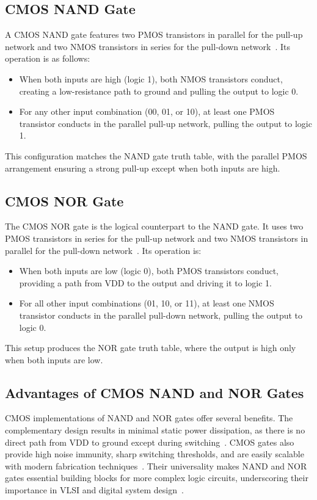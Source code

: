 \documentclass[12pt]{article}
\begin{document}
\subsection*{CMOS NAND Gate}
A CMOS NAND gate features two PMOS transistors in parallel for the pull-up network and two NMOS transistors in series for the pull-down network~\cite{weste2015cmos}. Its operation is as follows:
\begin{itemize}
    \item When both inputs are high (logic 1), both NMOS transistors conduct, creating a low-resistance path to ground and pulling the output to logic 0.
    \item For any other input combination (00, 01, or 10), at least one PMOS transistor conducts in the parallel pull-up network, pulling the output to logic 1.
\end{itemize}
This configuration matches the NAND gate truth table, with the parallel PMOS arrangement ensuring a strong pull-up except when both inputs are high.

\subsection*{CMOS NOR Gate}
The CMOS NOR gate is the logical counterpart to the NAND gate. It uses two PMOS transistors in series for the pull-up network and two NMOS transistors in parallel for the pull-down network~\cite{kang2019cmos}. Its operation is:
\begin{itemize}
    \item When both inputs are low (logic 0), both PMOS transistors conduct, providing a path from VDD to the output and driving it to logic 1.
    \item For all other input combinations (01, 10, or 11), at least one NMOS transistor conducts in the parallel pull-down network, pulling the output to logic 0.
\end{itemize}
This setup produces the NOR gate truth table, where the output is high only when both inputs are low.

\subsection*{Advantages of CMOS NAND and NOR Gates}
CMOS implementations of NAND and NOR gates offer several benefits. The complementary design results in minimal static power dissipation, as there is no direct path from VDD to ground except during switching~\cite{manohar2017digital}. CMOS gates also provide high noise immunity, sharp switching thresholds, and are easily scalable with modern fabrication techniques~\cite{weste2015cmos}. Their universality makes NAND and NOR gates essential building blocks for more complex logic circuits, underscoring their importance in VLSI and digital system design~\cite{kang2019cmos}.
\end{document}
